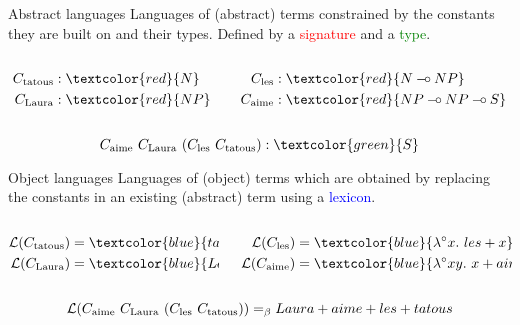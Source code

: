\documentclass{beamer}
\def\limp {\mathbin{{-}\mkern-3.5mu{\circ}}}
\begin{document}
\begin{frame}
  \begin{block}{Abstract languages}
    Languages of (abstract) terms constrained by the constants they are
    built on and their types. Defined by a \textcolor{red}{signature}
    and a \textcolor{green}{type}.

    \begin{columns}[t]
      \begin{column}{0.5\textwidth}
        \begin{align*}
          \synt{tatous} &: \textcolor{red}{N} \\
          \synt{Laura} &: \textcolor{red}{NP}
        \end{align*}
      \end{column}
      \begin{column}{0.5\textwidth}
        \begin{align*}
          \synt{les} &: \textcolor{red}{N \limp NP} \\
          \synt{aime} &: \textcolor{red}{NP \limp NP \limp S}
        \end{align*}
      \end{column}
    \end{columns}

    $$\synt{aime}\ \synt{Laura}\ (\synt{les}\ \synt{tatous}) :
    \textcolor{green}{S}$$
  \end{block}

  \begin{block}{Object languages}
    Languages of (object) terms which are obtained by replacing the
    constants in an existing (abstract) term using a \textcolor{blue}{lexicon}.

    \begin{columns}[t]
      \begin{column}{0.5\textwidth}
        \begin{align*}
          \mathcal{L}(\synt{tatous}) &= \textcolor{blue}{tatous} \\
          \mathcal{L}(\synt{Laura}) &= \textcolor{blue}{Laura}
        \end{align*}
      \end{column}
      \begin{column}{0.5\textwidth}
        \begin{align*}
          \mathcal{L}(\synt{les}) &= \textcolor{blue}{\lambda^{\circ} x.\ les + x} \\
          \mathcal{L}(\synt{aime}) &= \textcolor{blue}{\lambda^{\circ} x y.\ x + aime + y}
        \end{align*}
      \end{column}
    \end{columns}

    $$\mathcal{L}(\synt{aime}\ \synt{Laura}\ (\synt{les}\ \synt{tatous}))
    =_{\beta} Laura + aime + les + tatous$$
  \end{block}
\end{frame}
\end{document}
